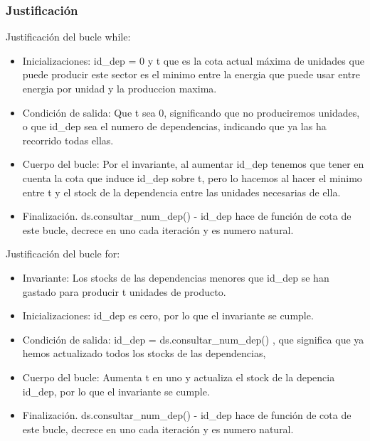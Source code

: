 \documentclass[10pt]{article}
\begin{document}
\subsubsection{Justificación}
Justificación del bucle while:
\begin{itemize}
\item Inicializaciones: id\_dep = 0 y t que es la cota actual máxima de unidades que puede producir este sector es el minimo entre la energia que puede usar entre energia por unidad y la produccion maxima.
\item Condición de salida: Que t sea 0, significando que no produciremos unidades, o que id\_dep sea el numero de dependencias, indicando que ya las ha recorrido todas ellas.
\item Cuerpo del bucle: Por el invariante, al aumentar id\_dep tenemos que tener en cuenta la cota que induce id\_dep sobre t, pero lo hacemos al hacer el minimo entre t y el stock de la dependencia entre las unidades necesarias de ella.
\item Finalización. ds.consultar\_num\_dep() - id\_dep hace de función de cota de este bucle, decrece en uno cada iteración y es numero natural.
\end{itemize}
Justificación del bucle for:
\begin{itemize}
\item Invariante: Los stocks de las dependencias menores que id\_dep se han gastado para producir t unidades de producto.
\item Inicializaciones: id\_dep es cero, por lo que el invariante se cumple.
\item Condición de salida: id\_dep = ds.consultar\_num\_dep() , que significa que ya hemos actualizado todos los stocks de las dependencias,
\item Cuerpo del bucle: Aumenta t en uno y actualiza el stock de la depencia id\_dep, por lo que el invariante se cumple.
\item Finalización. ds.consultar\_num\_dep() - id\_dep hace de función de cota de este bucle, decrece en uno cada iteración y es numero natural.
\end{itemize}
\end{document}
